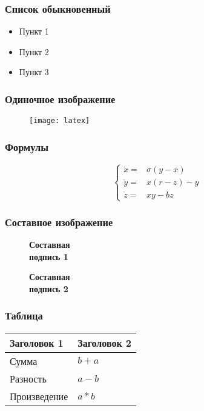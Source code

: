 \begin{frame}
\frametitle{Список обыкновенный}
\begin{itemize}
  \item Пункт 1
  \item Пункт 2
  \item Пункт 3
\end{itemize}
\end{frame}

\begin{frame}
\frametitle{Одиночное изображение}
\begin{figure}[H]
  \center
  \texttt{[image: latex]}
\end{figure}
\end{frame}

\begin{frame}
\frametitle{Формулы}
$$
\left\{
  \begin{array}{rl}
    \dot x = & \sigma (y-x) \\
    \dot y = & x (r - z) - y \\
    \dot z = & xy - bz
  \end{array}
\right.
$$
\end{frame}

\begin{frame}
\frametitle{Составное изображение}
\begin{figure}[h]
  \begin{minipage}[h]{0.47\linewidth}
    \textbf{Составная \\ подпись 1}
  \end{minipage}
  \hfill
  \begin{minipage}[h]{0.47\linewidth}
    \textbf{Составная \\ подпись 2}
  \end{minipage}
\end{figure}
\end{frame}

\begin{frame}
\frametitle{Таблица}
\begin{tabular}{|l|l|}
\hline
\textbf{Заголовок 1} & \textbf{Заголовок 2} \\
\hline
Сумма & $b+a$ \\
\hline
Разность & $a-b$ \\
\hline
Произведение & $a*b$ \\
\hline
\end{tabular}
\end{frame}

